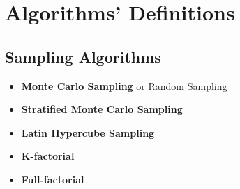 \appendix\chapter{Algorithms' Definitions}
\label{appendix:AlgorithmsDefinitions}


\section{Sampling Algorithms}
\begin{itemize}
\item \textbf{Monte Carlo Sampling} or Random Sampling
\item \textbf{Stratified Monte Carlo Sampling}
\item \textbf{Latin Hypercube Sampling}
\item \textbf{K-factorial}
\item \textbf{Full-factorial}
\end{itemize}


